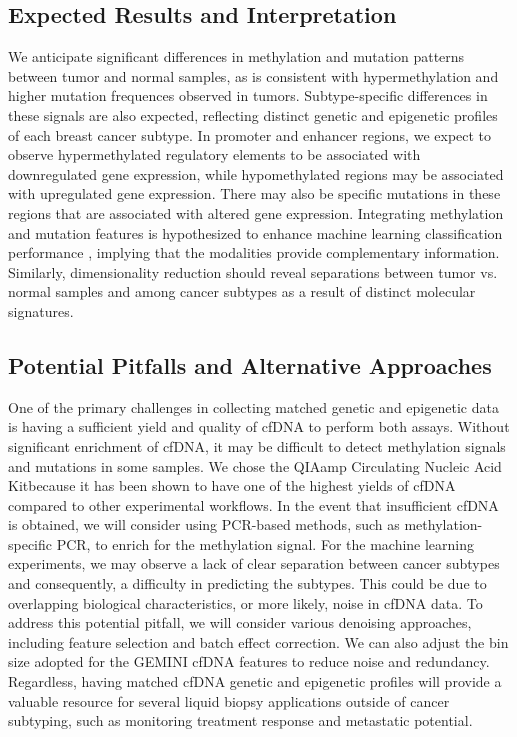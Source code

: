 \documentclass[11pt]{article}
\begin{document}
\subsection*{Expected Results and Interpretation}
We anticipate significant differences in methylation and mutation patterns between tumor and normal samples, as is consistent with hypermethylation and higher mutation frequences observed in tumors.
Subtype-specific differences in these signals are also expected, reflecting distinct genetic and epigenetic profiles of each breast cancer subtype.
In promoter and enhancer regions, we expect to observe hypermethylated regulatory elements to be associated with downregulated gene expression, while hypomethylated regions may be associated with upregulated gene expression. There may also be specific mutations in these regions that are associated with altered gene expression.
Integrating methylation and mutation features is hypothesized to enhance machine learning classification performance \cite{moldovan_multi-modal_2024}, implying that the modalities provide complementary information. Similarly, dimensionality reduction should reveal separations between tumor vs. normal samples and among cancer subtypes as a result of distinct molecular signatures.


\subsection*{Potential Pitfalls and Alternative Approaches}
One of the primary challenges in collecting matched genetic and epigenetic data is having a sufficient yield and quality of cfDNA to perform both assays. 
Without significant enrichment of cfDNA, it may be difficult to detect methylation signals and mutations in some samples. 
We chose the QIAamp Circulating Nucleic Acid Kitbecause it has been shown to have one of the highest yields of cfDNA compared to other experimental workflows.\cite{polatoglou_isolation_2022}
In the event that insufficient cfDNA is obtained, we will consider using PCR-based methods, such as methylation-specific PCR, to enrich for the methylation signal. \cite{ku_methylation-specific_2011}
For the machine learning experiments, we may observe a lack of clear separation between cancer subtypes and consequently, a difficulty in predicting the subtypes. This could be due to overlapping biological characteristics, or more likely, noise in cfDNA data.
To address this potential pitfall, we will consider various denoising approaches, including feature selection and batch effect correction. We can also adjust the bin size adopted for the GEMINI cfDNA features to reduce noise and redundancy. Regardless, having matched cfDNA genetic and epigenetic profiles will provide a valuable resource for several liquid biopsy applications outside of cancer subtyping, such as monitoring treatment response and metastatic potential.
\newpage



\nocite{*}
\end{document}
